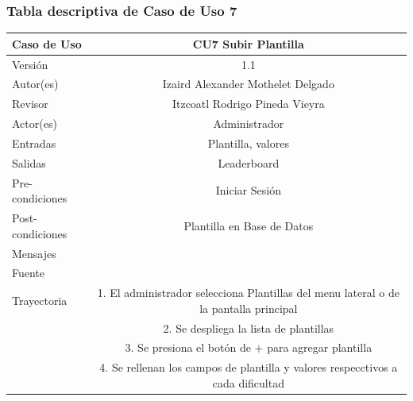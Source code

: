 \documentclass{article}
\begin{document}
\subsubsection{Tabla descriptiva de Caso de Uso 7}
\begin{tabular}{|M{5cm}|c|}
\hline
Caso de Uso & CU7 Subir Plantilla\\ \hline
Versión & 1.1\\ \hline
Autor(es) & Izaird Alexander Mothelet Delgado\\ \hline
Revisor &  Itzcoatl Rodrigo Pineda Vieyra \\ \hline
Actor(es) & Administrador \\ \hline
Entradas &  Plantilla, valores \\ \hline
Salidas & Leaderboard \\ \hline
Pre-condiciones & Iniciar Sesión \\ \hline
Post-condiciones & Plantilla en Base de Datos\\ \hline
Mensajes & \\
Fuente &  \\ \hline	
	Trayectoria
		& 1. El administrador selecciona Plantillas del menu lateral o de la pantalla principal \\
		& 2. Se despliega la lista de plantillas\\ 
		& 3. Se presiona el botón de + para agregar plantilla\\
		& 4. Se rellenan los campos de plantilla y valores respecctivos a  cada dificultad \\		
		\hline
		
\end{tabular}
\end{document}
